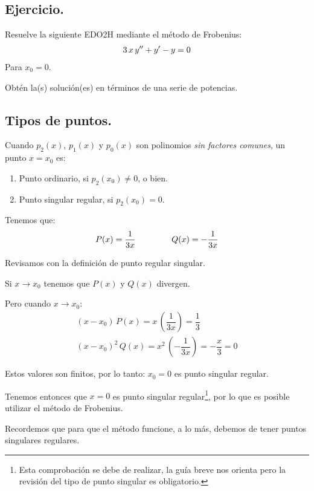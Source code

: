 \subsection{Ejercicio.}

Resuelve la siguiente EDO2H mediante el método de Frobenius:
\begin{align}
3 \, x \, {y}^{\prime \prime} + {y}^{\prime} - y = 0
\label{eq:ecuacion_04}    
\end{align}
Para $x_{0} = 0$.
\par
Obtén la(s) solución(es) en términos de una serie de potencias.

\subsection*{Tipos de puntos.}

Cuando $p_{2}(x)$, $p_{1}(x)$ y $p_{0}(x)$ son polinomios \emph{sin factores comunes}, un punto $x = x_{0}$ es:
\begin{enumerate}
\item Punto ordinario, si $p_{2}(x_{0}) \neq 0$, o bien.
\item Punto singular regular,  si $p_{2}(x_{0}) = 0$.
\end{enumerate}

Tenemos que:
\begin{align*}
P(x) = \dfrac{1}{3 x} \hspace{1.5cm} Q(x) = -\dfrac{1}{3 x}
\end{align*}

Revisamos con la definición de punto regular singular.

Si $x \to x_{0}$ tenemos que $P(x)$ y $Q(x)$ divergen.
\par
Pero cuando $x \to x_{0}$:
\begin{align*}
(x - x_{0}) \, P(x) = x \, \left( \dfrac{1}{3 x} \right) = \dfrac{1}{3} \\[1em] 
(x - x_{0})^{2} \, Q(x) = x^{2} \, \left( - \dfrac{1}{3 x} \right) = - \dfrac{x}{3} = 0
\end{align*}

Estos valores son finitos, por lo tanto: $x_{0} = 0$ es punto singular regular.
\par
Tenemos entonces que $x = 0$ es punto singular regular\footnote{Esta comprobación se debe de realizar, la guía breve nos orienta pero la revisión del tipo de punto singular es obligatorio.}, por lo que es posible utilizar el método de Frobenius.
\par
Recordemos que para que el método funcione, a lo más, debemos de tener puntos singulares regulares.


